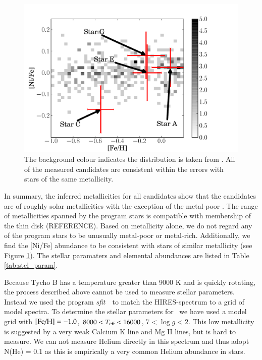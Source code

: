 \begin{figure}[h] %
   \centering
   \includegraphics[width=1\textwidth]{chapter_sn1572_hires/plots/abund_chiaki.pdf} 
   \caption{The background colour indicates the distribution is taken from \citet{2006ApJ...653.1145K}. All of the measured candidates are consistent within the errors with stars of the same metallicity.}
   \label{fig:kobayashi06}
\end{figure}

In summary, the inferred metallicities for all candidates show that the candidates are of roughly solar metallicities with the exception of the metal-poor \starc. The range of metallicities spanned by the program stars is compatible with membership of the thin disk (REFERENCE). Based on metallicity alone, we do not regard any of the program stars to be unusually metal-poor or metal-rich.  Additionally, we find the [Ni/Fe] abundance to be consistent with stars of similar metallicity (see Figure \ref{fig:kobayashi06}). The stellar paramaters and elemental abundances are listed in Table \ref{tab:stel_param}.

Because Tycho B has a temperature  greater than 9000 K and is quickly rotating, the process described above cannot be used to measure stellar parameters. Instead we used the program \textit{sfit}\ \citesfit\ to match the HIRES-spectrum to a grid of model spectra. To determine the stellar parameters for \starb\ we have used a model grid with $\textnormal{[Fe/H]} = -1.0$, $8000 < T_{\textnormal{eff}} < 16000$, $7 < \log{g} < 2$. This low metallicity is suggested by a very weak Calcium K line and Mg II lines, but is hard to measure. We can not measure Helium directly in this spectrum and thus adopt N(He) = 0.1 as this is empirically a very common Helium abundance in stars.

